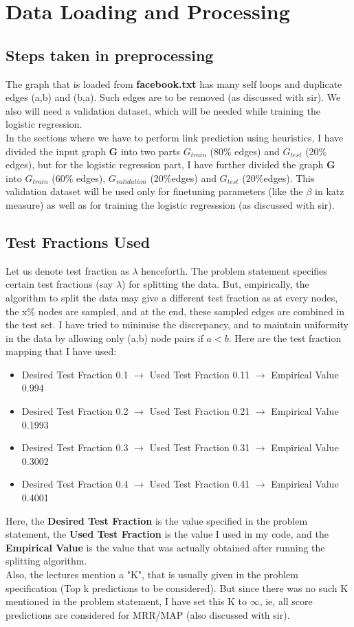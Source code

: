 \documentclass[12pt, a4paper]{article}
\begin{document}
\tableofcontents
\newpage

\section{Data Loading and Processing}
\subsection*{Steps taken in preprocessing}
\quad The graph that is loaded from \textbf{facebook.txt} has many self loops and duplicate edges (a,b) and (b,a). Such edges are to be removed (as discussed with sir). We also will need a validation dataset, which will be needed while training the logistic regression. \\
\null\quad In the sections where we have to perform link prediction using heuristics, I have divided the input graph \textbf{G} into two parts $G_{train}$ (80\% edges) and $G_{test}$ (20\% edges), but for the logistic regression part, I have further divided the graph \textbf{G} into $G_{train}$ (60\% edges), $G_{validation}$ (20\%edges) and $G_{test}$ (20\%edges). This validation dataset will be used only for finetuning parameters (like the $\beta$ in katz measure) as well as for training the logistic regresssion (as discussed with sir).
\subsection*{Test Fractions Used}
Let us denote test fraction as $\lambda$ henceforth.
\quad The problem statement specifies certain test fractions (say $\lambda$) for splitting the data. But, empirically, the algorithm to split the data may give a different test fraction as at every nodes, the x\% nodes are sampled, and at the end,  these sampled edges are combined in the test set. I have tried to minimise the discrepancy, and to maintain uniformity in the data by allowing only (a,b) node pairs if $a < b$. Here are the test fraction mapping that I have used:
\begin{itemize}
\item Desired Test Fraction 0.1 $\rightarrow$ Used Test Fraction 0.11 $\rightarrow$ Empirical Value 0.994
\item Desired Test Fraction 0.2 $\rightarrow$ Used Test Fraction 0.21 $\rightarrow$ Empirical Value 0.1993
\item Desired Test Fraction 0.3 $\rightarrow$ Used Test Fraction 0.31 $\rightarrow$ Empirical Value 0.3002
\item Desired Test Fraction 0.4 $\rightarrow$ Used Test Fraction 0.41 $\rightarrow$ Empirical Value 0.4001
\end{itemize}
Here, the \textbf{Desired Test Fraction }is the value specified in the problem statement, the \textbf{Used Test Fraction} is the value I used in my code, and the \textbf{Empirical Value} is the value that was actually obtained after running the splitting algorithm.\\
\null\quad Also, the lectures mention a "K", that is usually given in the problem specification (Top k predictions to be considered). But since there was no such K mentioned in the problem statement, I have set this K to $\infty$, ie, all score predictions are considered for MRR/MAP (also discussed with sir).
\newpage
\end{document}
